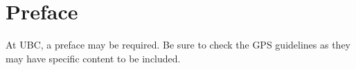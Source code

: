 
\chapter{Preface}

At UBC, a preface may be required.  Be sure to check the GPS guidelines as they may have specific content to be included.
